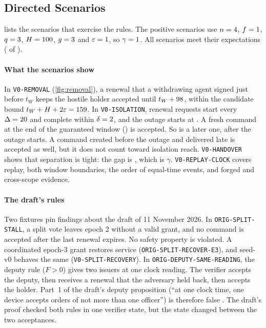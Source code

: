\subsection{Directed Scenarios}
\label{sec:scenarios}

 lists the scenarios that exercise the rules. The positive scenarios
use $n = 4$, $f = 1$, $q = 3$, $H = 100$, $g = 3$ and
$\varepsilon = 1$, so $\gamma = 1$. All \SeedScenarioCount{} scenarios meet their
expectations (\SeedPassCount{} of \SeedScenarioCount{}).

\begin{table}[t]
\caption{Directed scenarios of seed-v0 and of the 11 November 2026 rules, with the
negative controls. ``Acc.'' is the number of accepted commands. ``Violations found'' are
the checker's codes. ``Met'' means that every expectation of the scenario holds.
Generated from the traces.}
\label{tab:scenarios}
\centering
\footnotesize

\end{table}

\paragraph{What the scenarios show}
In \texttt{V0-REMOVAL} (\cref{fig:removal}), a renewal that a withdrawing agent signed just
before $t_W$ keeps the hostile holder accepted until $t_W + 98$, within the
candidate bound $t_W + H + 2\varepsilon = 159$. In \texttt{V0-ISOLATION}, renewal
requests start every $\Delta = 20$ and complete within
$\delta = 2$, and the outage starts at \IsolationOutage{}. A fresh command
at the end of the guaranteed window (\IsolationWindowEnd) is accepted. So is a later one,
\IsolationFreshSpan{} after the outage starts. A command created before the outage and
delivered late is accepted as well, but it does not count toward isolation reach.
\texttt{V0-HANDOVER} shows that separation is tight: the gap is \HandoverGap{}, which is
$\gamma$. \texttt{V0-REPLAY-CLOCK} covers replay, both window boundaries, the order of
equal-time events, and forged and cross-scope evidence.

\paragraph{The draft's rules}
Two fixtures pin findings about the draft of 11 November 2026. In
\texttt{ORIG-SPLIT-STALL}, a split vote leaves epoch 2 without a valid grant, and no
command is accepted after the last renewal expires. No safety property is violated. A
coordinated epoch-3 grant restores service (\texttt{ORIG-SPLIT-RECOVER-E3}), and seed-v0
behaves the same (\texttt{V0-SPLIT-RECOVERY}). In \texttt{ORIG-DEPUTY-SAME-READING}, the
deputy rule ($F > 0$) gives two issuers at one clock reading. The verifier accepts the
deputy, then receives a renewal that the adversary held back, then accepts the holder.
Part~1 of the draft's deputy proposition (``at one clock time, one device accepts orders
of not more than one officer'') is therefore false . The draft's proof checked
both rules in one verifier state, but the state changed between the two acceptances.

